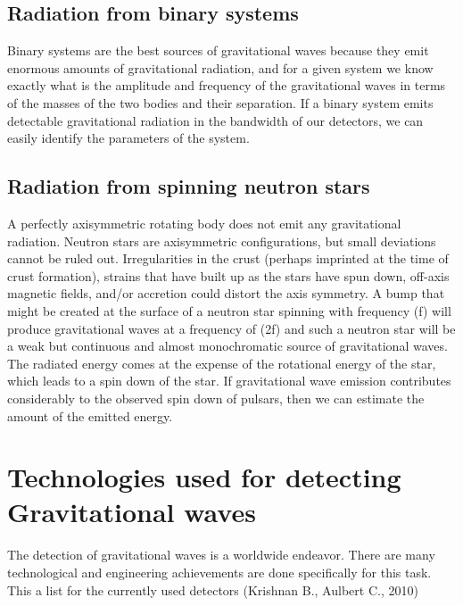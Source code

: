 \documentclass[11]{article}
\begin{document}
\subsection{Radiation from binary systems}
Binary systems are the best sources of gravitational waves because they emit enormous amounts of gravitational radiation, and for a given system we know exactly what is the amplitude and frequency of the gravitational waves in terms of the masses of the two bodies and their separation. If a binary system emits detectable gravitational radiation in the bandwidth of our detectors, we can easily identify the parameters of the system.

\subsection{Radiation from spinning neutron stars}
A perfectly axisymmetric rotating body does not emit any gravitational radiation.
Neutron stars are axisymmetric configurations, but small deviations cannot be ruled
out. Irregularities in the crust (perhaps imprinted at the time of crust formation),
strains that have built up as the stars have spun down, off-axis magnetic fields,
and/or accretion could distort the axis symmetry. A bump that might be created at
the surface of a neutron star spinning with frequency (f) will produce gravitational
waves at a frequency of (2f) and such a neutron star will be a weak but continuous and almost monochromatic source of gravitational waves. The radiated energy comes at the expense of the rotational energy of the star, which leads to a spin down of the star. If gravitational wave emission contributes considerably to the observed spin down of pulsars, then we can estimate the amount of the emitted energy.

\vspace{5mm}
\section{Technologies used for detecting Gravitational waves}
The detection of gravitational waves is a worldwide endeavor. There are many technological and engineering achievements are done specifically for this task.
This a list for the currently used detectors (Krishnan B., Aulbert C., 2010)
\end{document}

